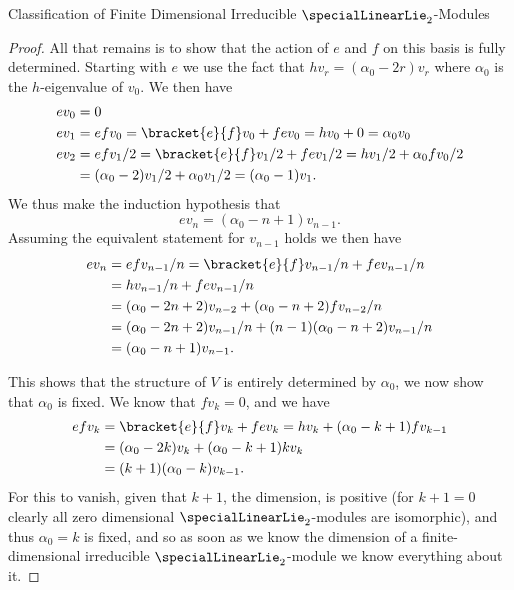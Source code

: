 \documentclass[fleqn]{NotesClass}
\begin{document}
\begin{prp}{Classification of Finite Dimensional Irreducible \(\specialLinearLie_2\)-Modules}{}
\begin{proof}
            All that remains is to show that the action of \(e\) and \(f\) on this basis is fully determined.
            Starting with \(e\) we use the fact that \(hv_r = (\alpha_0 - 2r)v_r\) where \(\alpha_0\) is the \(h\)-eigenvalue of \(v_0\).
            We then have
            \begin{align}
                ev_0 &= 0\\
                ev_1 &= efv_0 = \bracket{e}{f}v_0 + fev_0 = hv_0 + 0 = \alpha_0 v_0\\
                ev_2 &= efv_1/2 = \bracket{e}{f}v_1/2 + fev_1/2 = hv_1/2 + \alpha_0fv_0/2\\
                &= (\alpha_0 - 2)v_1/2 + \alpha_0v_1/2 = (\alpha_0 - 1)v_1.
            \end{align}
            We thus make the induction hypothesis that
            \begin{equation}
                ev_n = (\alpha_0 - n + 1)v_{n-1}.
            \end{equation}
            Assuming the equivalent statement for \(v_{n - 1}\) holds we then have
            \begin{align}
                ev_n &= efv_{n-1}/n = \bracket{e}{f}v_{n-1}/n + fev_{n-1}/n\\
                &= hv_{n-1}/n + fev_{n-1}/n\\
                &= (\alpha_0 - 2n + 2)v_{n-2} + (\alpha_0 - n + 2) fv_{n-2}/n\\
                &= (\alpha_0 - 2n + 2)v_{n-1}/n + (n - 1)(\alpha_0 - n + 2)v_{n-1}/n\\
                &= (\alpha_0 - n + 1)v_{n-1}.
            \end{align}
            
            This shows that the structure of \(V\) is entirely determined by \(\alpha_0\), we now show that \(\alpha_0\) is fixed.
            We know that \(fv_k = 0\), and we have
            \begin{align}
                efv_k &= \bracket{e}{f}v_k + fev_k = hv_k + (\alpha_0 - k + 1)fv_{k-1}\\
                &= (\alpha_0 - 2k)v_k + (\alpha_0 - k + 1)k v_k\\
                &= (k + 1)(\alpha_0 - k)v_{k-1}.
            \end{align}
            For this to vanish, given that \(k + 1\), the dimension, is positive (for \(k + 1 = 0\) clearly all zero dimensional \(\specialLinearLie_2\)-modules are isomorphic), and thus \(\alpha_0 = k\) is fixed, and so as soon as we know the dimension of a finite-dimensional irreducible \(\specialLinearLie_2\)-module we know everything about it.
        \end{proof}
    \end{prp}
    
\end{document}
